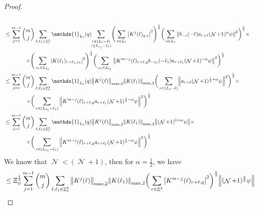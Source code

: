 \documentclass[sn-mathphys, Numbered ,a4paper]{sn-jnl}%
\DeclareMathOperator{\Z}{\mathbb{Z}}
\DeclareMathOperator{\NN}{\mathcal{N}}
\newcommand{\half}{\frac{1}{2}}
\newcommand{\normmaxii}[1]{\norm{#1}_{\mathrm{max,2}}}
\theoremstyle{plain}
\theoremstyle{definition}
\theoremstyle{remark}
\theoremstyle{plain}
\theoremstyle{definition}
\theoremstyle{remark}
\begin{document}
{\begin{proof}
\begin{alignat}{2}
\begin{aligned}[t]
 	\end{aligned} \nonumber\\
 	&\leq \sum\limits_{j=1}^{m-1} \begin{aligned}[t] {{m}\choose j} &\sum\limits_{\ell, \ell_1\in \Z^3_*} \mathds{1}_{L_{\ell}}(q)\!\! 
 		\sum\limits_{\substack{r\in (L_{\ell}-\ell) \\ \cap (L_{\ell_1}-\ell_1)}}\! \Bigg( \sum\limits_{s \in L_\ell} \abs{K^{j}(\ell)_{q,s}}^2\Bigg)^\half \bigg( \sum\limits_{s \in L_\ell}\norm{  b_{-s}(-\ell) a_{r+\ell} (\NN+1)^{\alpha}\psi}^2\bigg)^\half \times\nonumber\\ \times \Bigg( &\sum\limits_{s_1 \in L_{\ell_1}} \abs{ K(\ell_1)_{r+\ell_1,s_1} }^2\Bigg)^\half \bigg(\sum\limits_{s_1 \in L_{\ell_1}}\norm{ K^{m-j}(\ell)_{r+\ell,q}  b_{-s_1}(-\ell_1)  a_{r+\ell_1} (\NN+1)^{-\alpha}\psi }^2\bigg)^\half
 	\end{aligned} \nonumber\\   
 	&\leq \sum\limits_{j=1}^{m-1} \begin{aligned}[t]{{m}\choose j} &\sum\limits_{\ell,\ell_1 \in \Z^3_*} \mathds{1}_{L_{\ell}}(q) \normmaxii{K^j(\ell)} \normmaxii{K(\ell_1)} 
 		\bigg( \sum\limits_{r\in (L_{\ell}-\ell)}\!  \norm{ a_{r+\ell} (\NN+1)^{\half+\alpha}\psi}^2\bigg)^\half \times \nonumber\\ \times 
 		\bigg( &\sum\limits_{r\in (L_{\ell_1}-\ell_1) }\norm{ K^{m-j}(\ell)_{r+\ell,q}   a_{r+\ell_1} (\NN+1)^{\half-\alpha}\psi }^2\bigg)^\half
 	\end{aligned} \nonumber\\
 	&\leq \sum\limits_{j=1}^{m-1} \begin{aligned}[t]{{m}\choose j} &\sum\limits_{\ell,\ell_1 \in \Z^3_*} \mathds{1}_{L_{\ell}}(q) \normmaxii{K^j(\ell)} \normmaxii{K(\ell_1)}  
 		\norm{ (\NN+1)^{1+\alpha}\psi} \times \nonumber\\ \times 
 		\bigg( &\sum\limits_{r\in  (L_{\ell_1}-\ell_1) }  \norm{ K^{m-j}(\ell)_{r+\ell,q} a_{r+\ell_1} (\NN+1)^{\half-\alpha}\psi }^2\bigg)^\half \end{aligned} \nonumber\\
 \end{alignat}
 We know that $\NN<(\NN+1)$, then for $\alpha = \half$, we have
 \begin{alignat}{2}
 	&\leq \Xi_{\psi}^\half\sum\limits_{j=1}^{m-1} {{m}\choose j} \sum\limits_{\ell, \ell_1\in \Z^3_*} \normmaxii{K^j(\ell)} \normmaxii{K(\ell_1)} \bigg(\sum\limits_{r\in \Z^3}  \abs{ K^{m-j}(\ell)_{r+\ell,q} }^2\bigg)^\half  \norm{(\NN+1)^\frac{3}{2} \psi}  \nonumber\\

\end{alignat}
\end{proof}}
\end{document}
